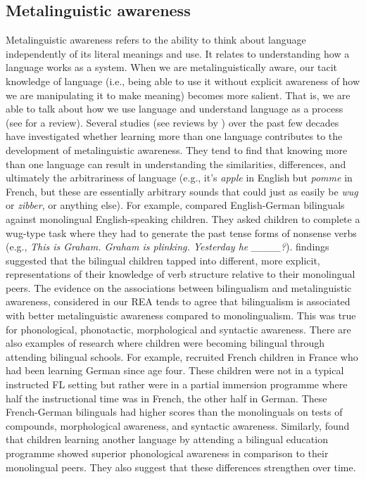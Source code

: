 \documentclass[output=paper]{langscibook}
\begin{document}
\subsection{Metalinguistic awareness}

Metalinguistic awareness refers to the ability to think about language independently of its literal meanings and use. It relates to understanding how a language works as a system. When we are metalinguistically aware, our tacit knowledge of language (i.e., being able to use it without explicit awareness of how we are manipulating it to make meaning) becomes more salient. That is, we are able to talk about how we use language and understand language as a process (see \citealt{Roehr-Brackin2018} for a review). Several studies (see reviews by \citealt{FoxEtAl2019,FoxEtAl2020}) over the past few decades have investigated whether learning more than one language contributes to the development of metalinguistic awareness. They tend to find that knowing more than one language can result in understanding the similarities, differences, and ultimately the arbitrariness of language (e.g., it’s \textit{apple} in English but \textit{pomme} in French, but these are essentially arbitrary sounds that could just as easily be \textit{wug} or \textit{zibber}, or anything else). For example, \citet{MurphyPine2003} compared English-German bilinguals against monolingual English-speaking children. They asked children to complete a wug-type task \citep{Berko1958} where they had to generate the past tense forms of nonsense verbs (e.g., \textit{This is Graham. Graham is plinking. Yesterday he \_\_\_\_?}).  findings suggested that the bilingual children tapped into different, more explicit, representations of their knowledge of verb structure relative to their monolingual peers. The evidence on the associations between bilingualism and metalinguistic awareness, considered in our REA tends to agree that bilingualism is associated with better metalinguistic awareness compared to monolingualism. This was true for phonological, phonotactic, morphological and syntactic awareness. There are also examples of research where children were becoming bilingual through attending bilingual schools. For example, \citet{RederEtAl2013} recruited French children in France who had been learning German since age four. These children were not in a typical instructed FL setting but rather were in a partial immersion programme where half the instructional time was in French, the other half in German. These French-German bilinguals had higher scores than the monolinguals on tests of compounds, morphological awareness, and syntactic awareness. Similarly, \citet{LaurentMartinot2010} found that children learning another language by attending a bilingual education programme showed superior phonological awareness in comparison to their monolingual peers. They also suggest that these differences strengthen over time.
\end{document}
